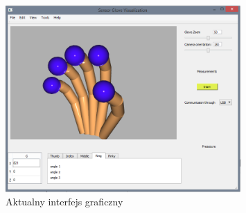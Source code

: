 \documentclass[12pt,a4paper]{article}
\begin{document}
\begin{figure}[ht!]
\centering
\includegraphics[width=0.8\textwidth]{images/aktualnyinterfejsgraficzny.png}
\caption{Aktualny interfejs graficzny}
\label{fig:wds}
\end{figure}
\end{document}
